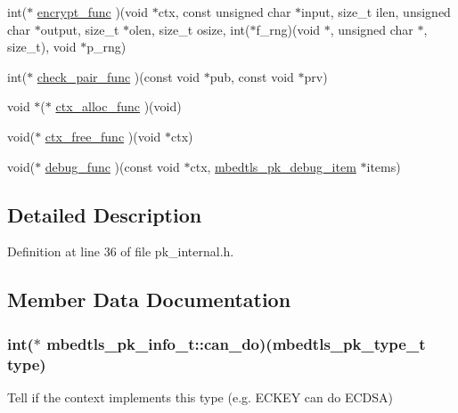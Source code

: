 \begin{DoxyCompactItemize}
\item 
int($\ast$ \hyperlink{structmbedtls__pk__info__t_a67f899cad3ca0fde066ad2b95ffcd3c3}{encrypt\-\_\-func} )(void $\ast$ctx, const unsigned char $\ast$input, size\-\_\-t ilen, unsigned char $\ast$output, size\-\_\-t $\ast$olen, size\-\_\-t osize, int($\ast$f\-\_\-rng)(void $\ast$, unsigned char $\ast$, size\-\_\-t), void $\ast$p\-\_\-rng)
\item 
int($\ast$ \hyperlink{structmbedtls__pk__info__t_ab3b1ab920fa03e0f4698d45a50978d75}{check\-\_\-pair\-\_\-func} )(const void $\ast$pub, const void $\ast$prv)
\item 
void $\ast$($\ast$ \hyperlink{structmbedtls__pk__info__t_a05d4488be20910fb48a835ba9753bbbe}{ctx\-\_\-alloc\-\_\-func} )(void)
\item 
void($\ast$ \hyperlink{structmbedtls__pk__info__t_a3e5e57d7c65e78d461d294dbed3dda76}{ctx\-\_\-free\-\_\-func} )(void $\ast$ctx)
\item 
void($\ast$ \hyperlink{structmbedtls__pk__info__t_a6e50ba92ec8b18dc5568e125a834a808}{debug\-\_\-func} )(const void $\ast$ctx, \hyperlink{structmbedtls__pk__debug__item}{mbedtls\-\_\-pk\-\_\-debug\-\_\-item} $\ast$items)
\end{DoxyCompactItemize}


\subsection{Detailed Description}


Definition at line 36 of file pk\-\_\-internal.\-h.



\subsection{Member Data Documentation}
\hypertarget{structmbedtls__pk__info__t_a65e19ae2ef1eea61d69f9c2a6033191a}{
\subsubsection[{can\-\_\-do}]{\setlength{\rightskip}{0pt plus 5cm}int($\ast$ mbedtls\-\_\-pk\-\_\-info\-\_\-t\-::can\-\_\-do)({\bf mbedtls\-\_\-pk\-\_\-type\-\_\-t} {\bf type})}}\label{structmbedtls__pk__info__t_a65e19ae2ef1eea61d69f9c2a6033191a}
Tell if the context implements this type (e.\-g. E\-C\-K\-E\-Y can do E\-C\-D\-S\-A) 

